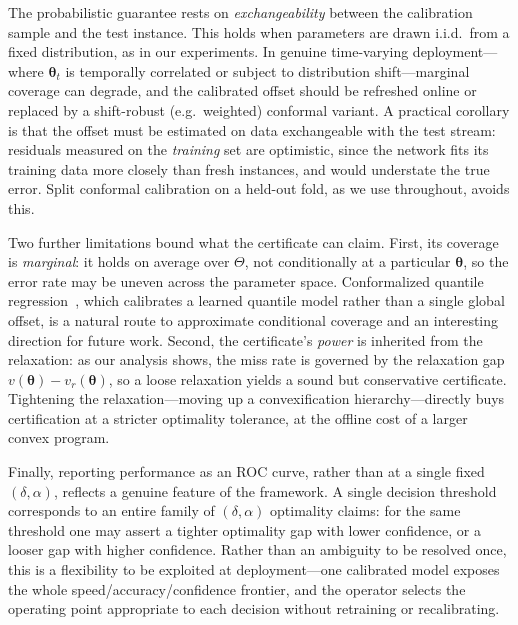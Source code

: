 \documentclass[10pt]{article} %
\theoremstyle{plain}
\theoremstyle{definition}
\theoremstyle{remark}
\begin{document}
The probabilistic guarantee rests on \emph{exchangeability} between the
calibration sample and the test instance. This holds when parameters are drawn
i.i.d.\ from a fixed distribution, as in our experiments. In genuine time-varying
deployment---where $\bm{\theta}_t$ is temporally correlated or subject to
distribution shift---marginal coverage can degrade, and the calibrated offset
should be refreshed online or replaced by a shift-robust (e.g.\ weighted)
conformal variant. A practical corollary is that the offset must be estimated on
data exchangeable with the test stream: residuals measured on the \emph{training}
set are optimistic, since the network fits its training data more closely than
fresh instances, and would understate the true error. Split conformal calibration
on a held-out fold, as we use throughout, avoids this.

Two further limitations bound what the certificate can claim. First, its coverage
is \emph{marginal}: it holds on average over $\Theta$, not conditionally at a
particular $\bm{\theta}$, so the error rate may be uneven across the parameter
space. Conformalized quantile regression~\citep{romano2019conformalized}, which
calibrates a learned quantile model rather than a single global offset, is a
natural route to approximate conditional coverage and an interesting direction for
future work. Second, the certificate's \emph{power} is inherited from the
relaxation: as our analysis shows, the miss rate is governed by the relaxation gap
$v(\bm{\theta}) - v_r(\bm{\theta})$, so a loose relaxation yields a sound but
conservative certificate. Tightening the relaxation---moving up a convexification
hierarchy---directly buys certification at a stricter optimality tolerance, at the
offline cost of a larger convex program.

Finally, reporting performance as an ROC curve, rather than at a single fixed
$(\delta, \alpha)$, reflects a genuine feature of the framework. A single decision
threshold corresponds to an entire family of $(\delta, \alpha)$ optimality claims:
for the same threshold one may assert a tighter optimality gap with lower
confidence, or a looser gap with higher confidence. Rather than an ambiguity to be
resolved once, this is a flexibility to be exploited at deployment---one calibrated
model exposes the whole speed/accuracy/confidence frontier, and the operator
selects the operating point appropriate to each decision without retraining or
recalibrating.
\end{document}
